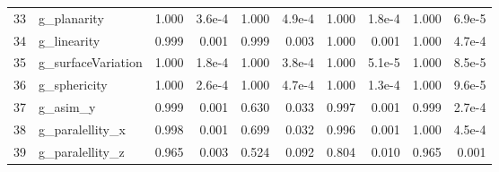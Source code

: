 \begin{table}[t!]
\begin{adjustbox}{max width=\textwidth}
\begin{tabular}{llrrrrrrrr}
33 & g\_planarity & 1.000 & 3.6e-4 & 1.000 & 4.9e-4 & 1.000 & 1.8e-4 & 1.000 & 6.9e-5 \\
34 & g\_linearity & 0.999 & 0.001 & 0.999 & 0.003 & 1.000 & 0.001 & 1.000 & 4.7e-4 \\
35 & g\_surfaceVariation & 1.000 & 1.8e-4 & 1.000 & 3.8e-4 & 1.000 & 5.1e-5 & 1.000 & 8.5e-5 \\
36 & g\_sphericity & 1.000 & 2.6e-4 & 1.000 & 4.7e-4 & 1.000 & 1.3e-4 & 1.000 & 9.6e-5 \\
37 & g\_asim\_y & 0.999 & 0.001 & 0.630 & 0.033 & 0.997 & 0.001 & 0.999 & 2.7e-4 \\
38 & g\_paralellity\_x & 0.998 & 0.001 & 0.699 & 0.032 & 0.996 & 0.001 & 1.000 & 4.5e-4 \\
39 & g\_paralellity\_z & 0.965 & 0.003 & 0.524 & 0.092 & 0.804 & 0.010 & 0.965 & 0.001 \\
\bottomrule
\end{tabular}
\end{adjustbox}
\end{table}
